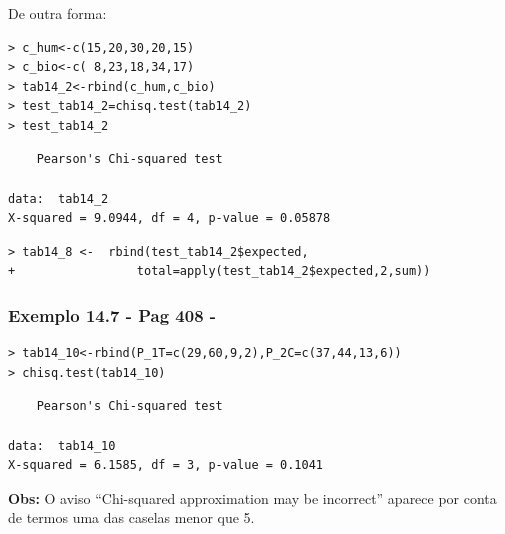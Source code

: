 \documentclass[14pt,aspectratio=1610]{beamer}
\begin{document}
\begin{frame}[fragile]{}
\frametitle{}
\begin{block}{}
De outra forma:
\begin{verbatim}
> c_hum<-c(15,20,30,20,15)
> c_bio<-c( 8,23,18,34,17)
> tab14_2<-rbind(c_hum,c_bio)
> test_tab14_2=chisq.test(tab14_2)
> test_tab14_2
\end{verbatim}

\begin{verbatim}
	Pearson's Chi-squared test

data:  tab14_2
X-squared = 9.0944, df = 4, p-value = 0.05878
\end{verbatim}

\begin{verbatim}
> tab14_8 <-  rbind(test_tab14_2$expected, 
+                 total=apply(test_tab14_2$expected,2,sum))
\end{verbatim}

\end{block}
\end{frame}


\begin{frame}[fragile]{}
\frametitle{Exemplo 14.7 - Pag 408 - \cite{Morettin09}}
\begin{block}{}
\begin{verbatim}
> tab14_10<-rbind(P_1T=c(29,60,9,2),P_2C=c(37,44,13,6))
> chisq.test(tab14_10)    
\end{verbatim}

\begin{verbatim}
	Pearson's Chi-squared test

data:  tab14_10
X-squared = 6.1585, df = 3, p-value = 0.1041    
\end{verbatim}

{\bf Obs:} O aviso “Chi-squared approximation may be incorrect” aparece por conta de termos uma das caselas menor que 5.

\end{block}
\end{frame}
\end{document}
